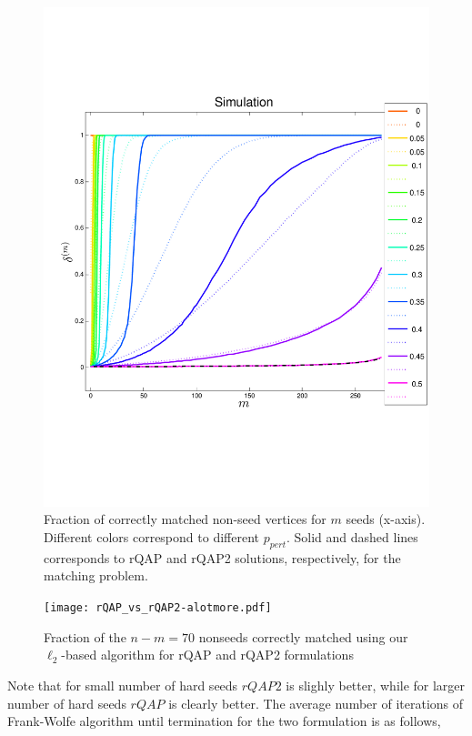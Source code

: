 \documentclass[12pt,oneside,final]{thesis}\usepackage[]{graphicx}\usepackage[]{color}
\begin{document}
\begin{figure}
 \centering
  \caption{ Fraction of correctly matched non-seed vertices for $m$ seeds (x-axis). Different colors correspond to different  $p_{pert}$. Solid and dashed lines corresponds to rQAP and rQAP2 solutions, respectively, for the matching problem.
 \label{rqap2}}
 \includegraphics[width=1.2\textwidth]{sim_bitflip_rqap2_300_hsv.pdf}
\end{figure}

\begin{figure}
 \centering
  \caption{Fraction of the $n-m=70$ nonseeds correctly matched using our $\ell_2$-based algorithm for rQAP and rQAP2 formulations
 \label{figell2}}
 \texttt{[image: rQAP\_vs\_rQAP2-alotmore.pdf]}
\end{figure}
Note that for small number of hard seeds $rQAP2$ is slighly better, while for larger number of hard seeds $rQAP$ is clearly better. The average number of iterations of Frank-Wolfe algorithm until termination for the two formulation is as follows,
\end{document}
